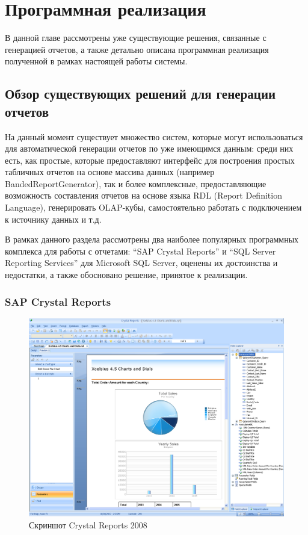 \section{Программная реализация}
В данной главе рассмотрены уже существующие решения, связанные с генерацией отчетов, 
а также детально описана программная реализация полученной в рамках настоящей работы системы.

\subsection{Обзор существующих решений для генерации отчетов}
На данный момент существует множество систем, которые могут использоваться
для автоматической генерации отчетов по уже имеющимся данным: 
среди них есть, как простые, которые предоставляют интерфейс для построения
простых табличных отчетов на основе массива данных (например BandedReportGenerator\cite{BandedReportGenerator}),
так и более комплексные, предоставляющие возможность составления отчетов на основе 
языка RDL (Report Definition Language\cite{rdl_spec}), генерировать OLAP-кубы\cite{olap},
самостоятельно работать с подключением к источнику данных и т.д.

В рамках данного раздела рассмотрены два наиболее популярных программных комплекса
для работы с отчетами: ``SAP Crystal Reports''\cite{crystal_reports} и 
``SQL Server Reporting Services''\cite{sql_reporting} для Microsoft SQL Server, 
оценены их достоинства и недостатки, а также обосновано решение, принятое к реализации.

\subsubsection{SAP Crystal Reports}
\begin{figure}[!ht]
\begin{center}
\hspace*{-1cm} \includegraphics[scale=0.4]{../resources/CrystalReports2008.png}
\caption{Скриншот Crystal Reports 2008}
\label{gr:crystal_screenshot}
\end{center}
\end{figure}

